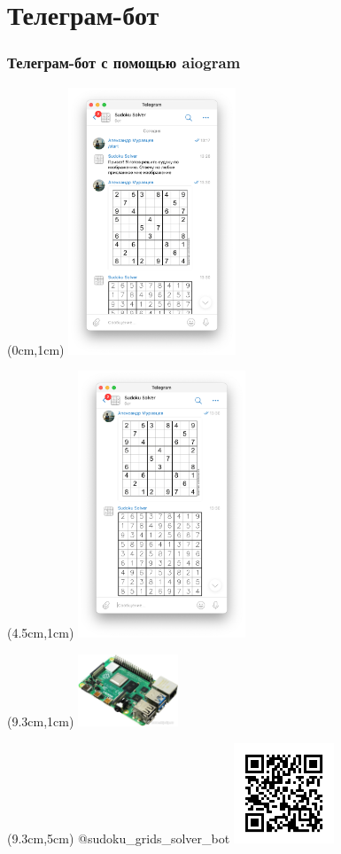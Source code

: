 \documentclass{beamer}
\begin{document}
\section{Телеграм-бот}
\begin{frame}
\frametitle{Телеграм-бот с помощью aiogram}
\begin{textblock*}{5cm}(0cm,1cm)
\includegraphics[width=5cm]{telegram_screen_1}
\end{textblock*}

\begin{textblock*}{5cm}(4.5cm,1cm)
\includegraphics[width=5cm]{telegram_screen_2}
\end{textblock*}

\begin{textblock*}{3cm}(9.3cm,1cm)
\includegraphics[width=3cm]{Rasberry}
\end{textblock*}

\begin{textblock*}{3cm}(9.3cm,5cm)
\tiny @sudoku\_grids\_solver\_bot
\includegraphics[width=3cm]{qr_frame}
\end{textblock*}

\end{frame}
\end{document}
